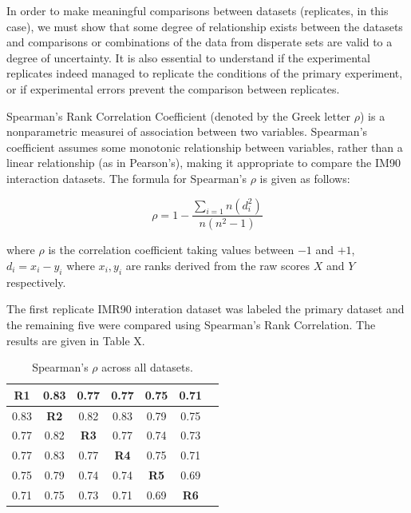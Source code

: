 \documentclass[phd,tocprelim]{cornell}
\begin{document}
In order to make meaningful comparisons between datasets (replicates,
in this case), we must show that some degree of relationship exists between
the datasets and comparisons or combinations of the data from disperate sets
are valid to a degree of uncertainty.  It is also essential to understand if the
experimental replicates indeed managed to replicate the conditions of the primary
experiment, or if experimental errors prevent the comparison between replicates.

Spearman's Rank Correlation Coefficient (denoted by the Greek letter $\rho$) is
a nonparametric measurei of association between two variables.
Spearman's coefficient assumes some monotonic relationship between variables,
rather than a linear relationship (as in Pearson's), making it appropriate
to compare the IM90 interaction datasets.  The formula for Spearman's $\rho$ is
given as follows:

\begin{equation}
\rho = 1 - \frac{\sum_{i=1}{n}(d_i^2)}{n(n^2 - 1)}
\end{equation}

where $\rho$ is the correlation coefficient taking values between $-1$ and $+1$,
$d_i = x_i - y_i$ where $x_i, y_i$ are ranks derived from the raw scores $X$ and
$Y$ respectively.

The first replicate IMR90 interation dataset was labeled the primary dataset
and the remaining five were compared using Spearman's Rank Correlation.  The
results are given in Table X.

\begin{table}
  \begin{tabular}{|c|*{6}{c|}}
    \toprule
    \textbf{R1} & 0.83 & 0.77 & 0.77 & 0.75 & 0.71 \\ \midrule
    0.83 & \textbf{R2} & 0.82 & 0.83 & 0.79 & 0.75 \\ \midrule
    0.77 & 0.82 & \textbf{R3} & 0.77 & 0.74 & 0.73 \\ \midrule
    0.77 & 0.83 & 0.77 & \textbf{R4} & 0.75 & 0.71 \\ \midrule
    0.75 & 0.79 & 0.74 & 0.74 & \textbf{R5} & 0.69 \\ \midrule
    0.71 & 0.75 & 0.73 & 0.71 & 0.69 & \textbf{R6} \\ \midrule
  \end{tabular}
  \caption{Spearman's $\rho$ across all datasets.}
\label{tab:correlations}
\end{table}

\end{document}
